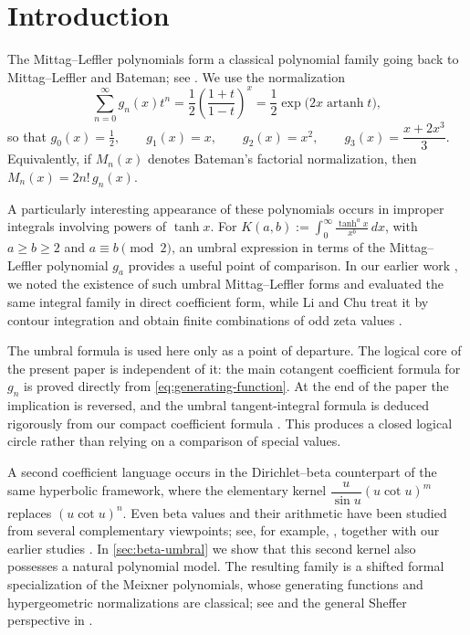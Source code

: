 \documentclass[11pt,twoside]{article}
\begin{document}
\vspace{0.5cm}

\section*{Introduction}

The Mittag--Leffler polynomials form a classical polynomial family going
back to Mittag--Leffler and Bateman; see \cite{MittagLeffler1891,Bateman1940}.
We use the normalization
\begin{equation}
\label{eq:generating-function}
\sum_{n=0}^{\infty}g_n(x)t^n
=\frac12\left(\frac{1+t}{1-t}\right)^x
=\frac12\exp\!\bigl(2x\operatorname{artanh}t\bigr),
\end{equation}
so that
\(g_0(x)=\frac12,\qquad g_1(x)=x,\qquad g_2(x)=x^2,\qquad g_3(x)=\dfrac{x+2x^3}{3}\).
Equivalently, if $M_n(x)$ denotes Bateman's factorial normalization,
then
\(M_n(x)=2n!\,g_n(x)\).

A particularly interesting appearance of these polynomials occurs in
improper integrals involving powers of $\tanh x$.  For \( \displaystyle K(a,b):=\int_0^\infty\frac{\tanh^a x}{x^b}\,dx\), with \(a\ge b\ge2\) and \(a\equiv b\pmod2\),
an umbral expression in terms of the Mittag--Leffler polynomial $g_a$
provides a useful point of comparison.  In our earlier work
\cite[Remark~4.7]{TallaWaffo2026}, we noted the existence of such umbral
Mittag--Leffler forms and evaluated the same integral family in direct
coefficient form, while Li and Chu treat it by contour integration and
obtain finite combinations of odd zeta values \cite{LiChu2024}.

The umbral formula is used here only as a point of departure.  The logical
core of the present
paper is independent of it: the main cotangent coefficient formula for
$g_n$ is proved directly from \eqref{eq:generating-function}.  At the end
of the paper the implication is reversed, and the umbral tangent-integral
formula is deduced rigorously from our compact coefficient formula
\cite{TallaWaffo2026}.  This produces a closed logical circle rather than
relying on a comparison of special values.


A second coefficient language occurs in the Dirichlet--beta counterpart
of the same hyperbolic framework, where the elementary kernel
\(\dfrac{u}{\sin u}(u\cot u)^m\)
replaces $(u\cot u)^n$.  Even beta values and their arithmetic have been
studied from several complementary viewpoints; see, for example,
\cite{Apostol1976,WeissteinBeta,Zudilin2019,Kyrion2025}, together with
our earlier studies \cite{talla_waffo_integral_2025,
TallaWaffo2026arxiv2602.16761}.  In \cref{sec:beta-umbral}
we show that this second kernel also possesses a natural polynomial
model.  The resulting family is a shifted formal specialization of the
Meixner polynomials, whose generating functions and hypergeometric
normalizations are classical; see \cite{NIST:DLMF,KoekoekLeskySwarttouw2010}
and the general Sheffer perspective in
\cite{Sheffer1939,RotaKahanerOdlyzko1973,Roman1984}.
\end{document}
